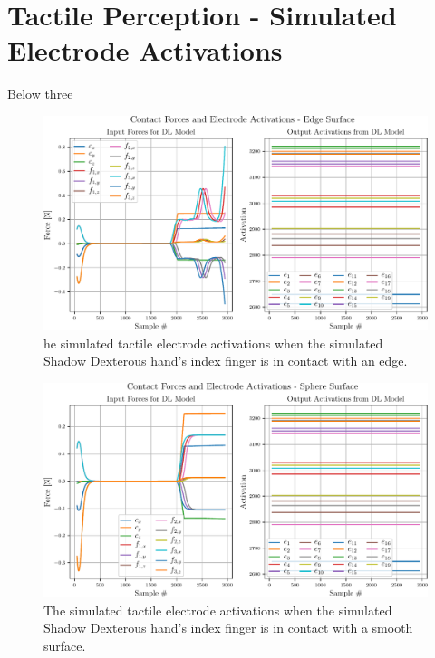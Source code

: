 \chapter{Tactile Perception - Simulated Electrode Activations} \label{app:tactile-perception-simulated-electrode-activations}

Below three 

\begin{figure}[h]
	\begin{center}
		\includegraphics[width=\textwidth]{chapters/1-tactile-perception/fig/matplotlib/edge-contact-graph.pdf}
	\end{center}
	\caption{he simulated tactile electrode activations when the simulated Shadow Dexterous hand's index finger is in contact with an edge.}
	\label{app:edge-contact-graph}
\end{figure}

\begin{figure}[h]
	\begin{center}
		\includegraphics[width=\textwidth]{chapters/1-tactile-perception/fig/matplotlib/sphere-contact-graph.pdf}
	\end{center}
	\caption{The simulated tactile electrode activations when the simulated Shadow Dexterous hand's index finger is in contact with a smooth surface.}
	\label{app:smooth-contact-graph}
\end{figure}


